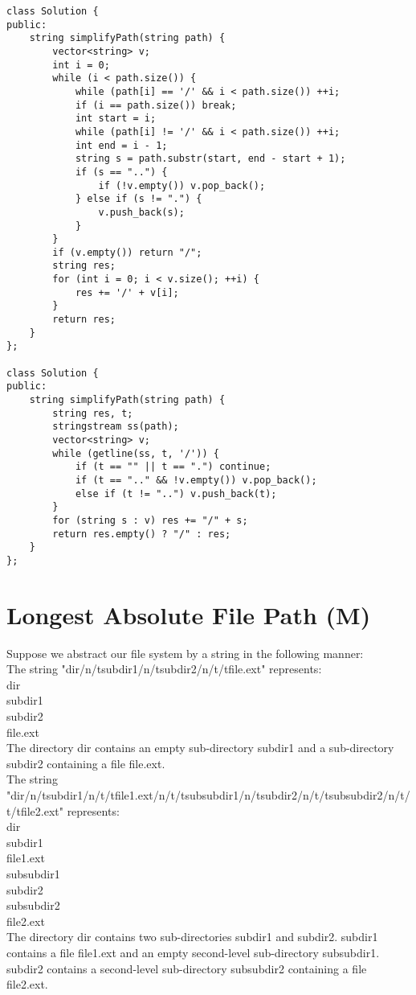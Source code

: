 \begin{lstlisting}
class Solution {
public:
    string simplifyPath(string path) {
        vector<string> v;
        int i = 0;
        while (i < path.size()) {
            while (path[i] == '/' && i < path.size()) ++i;
            if (i == path.size()) break;
            int start = i;
            while (path[i] != '/' && i < path.size()) ++i;
            int end = i - 1;
            string s = path.substr(start, end - start + 1);
            if (s == "..") {
                if (!v.empty()) v.pop_back(); 
            } else if (s != ".") {
                v.push_back(s);
            }
        }
        if (v.empty()) return "/";
        string res;
        for (int i = 0; i < v.size(); ++i) {
            res += '/' + v[i];
        }
        return res;
    }
};

class Solution {
public:
    string simplifyPath(string path) {
        string res, t;
        stringstream ss(path);
        vector<string> v;
        while (getline(ss, t, '/')) {
            if (t == "" || t == ".") continue;
            if (t == ".." && !v.empty()) v.pop_back();
            else if (t != "..") v.push_back(t);
        }
        for (string s : v) res += "/" + s;
        return res.empty() ? "/" : res;
    }
};
\end{lstlisting}


\section{Longest Absolute File Path (M)}
Suppose we abstract our file system by a string in the following manner:\\

The string "dir/n/tsubdir1/n/tsubdir2/n/t/tfile.ext" represents:\\
dir\\
    subdir1\\
    subdir2\\
        file.ext\\
The directory dir contains an empty sub-directory subdir1 and a sub-directory subdir2 containing a file file.ext.\\

The string "dir/n/tsubdir1/n/t/tfile1.ext/n/t/tsubsubdir1/n/tsubdir2/n/t/tsubsubdir2/n/t/t/tfile2.ext" represents:\\
dir\\
    subdir1\\
        file1.ext\\
        subsubdir1\\
    subdir2\\
        subsubdir2\\
            file2.ext\\
The directory dir contains two sub-directories subdir1 and subdir2. subdir1 contains a file file1.ext and an empty second-level sub-directory subsubdir1. subdir2 contains a second-level sub-directory subsubdir2 containing a file file2.ext.\\


